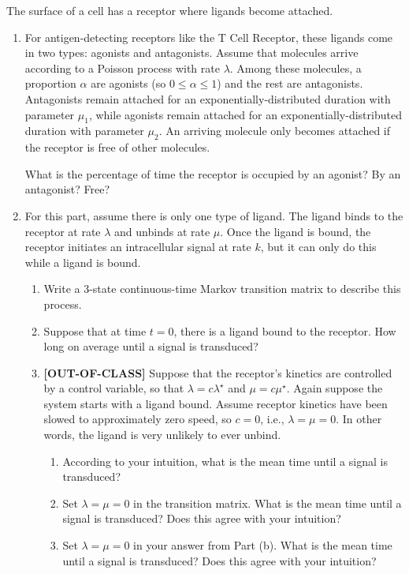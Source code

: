 \documentclass[12pt,letterpaper]{article}
\begin{document}
The surface of a cell has a receptor where ligands become attached. 

\begin{enumerate}






\item For antigen-detecting receptors like the T Cell Receptor, these ligands come in two types: agonists and antagonists. Assume that molecules arrive according to a Poisson process with rate $\lambda$. Among these molecules, a proportion $\alpha$ are agonists (so $0\leq \alpha \leq 1$) and the rest are antagonists. Antagonists remain attached for an exponentially-distributed duration with parameter $\mu_1$, while agonists remain attached for an exponentially-distributed duration with parameter $\mu_2$. An arriving molecule only becomes attached if the receptor is free of other molecules. 

What is the percentage of time the receptor is occupied by an agonist? By an antagonist? Free?

\item For this part, assume there is only one type of ligand. The ligand binds to the receptor at rate $\lambda$ and unbinds at rate $\mu$. Once the ligand is bound, the receptor initiates an intracellular signal at rate $k$, but it can only do this while a ligand is bound. 

\begin{enumerate}
\item Write a 3-state continuous-time Markov transition matrix to describe this process. 

\item Suppose that at time $t=0$, there is a ligand bound to the receptor. How long on average until a signal is transduced?

\item \textbf{[OUT-OF-CLASS]} Suppose that the receptor's kinetics are controlled by a control variable, so that $\lambda = c \lambda^\star$ and $\mu = c\mu^\star$. Again suppose the system starts with a ligand bound. Assume receptor kinetics have been slowed to approximately zero speed, so $c=0$, i.e., $\lambda=\mu=0$. In other words, the ligand is very unlikely to ever unbind.

\begin{enumerate}
\item According to your intuition, what is the mean time until a signal is transduced?
\item Set $\lambda=\mu=0$ in the transition matrix. What is the mean time until a signal is transduced? Does this agree with your intuition?
\item Set $\lambda=\mu=0$ in your answer from Part (b). What is the mean time until a signal is transduced? Does this agree with your intuition?
\end{enumerate}

\end{enumerate}


\end{enumerate}
\end{document}
